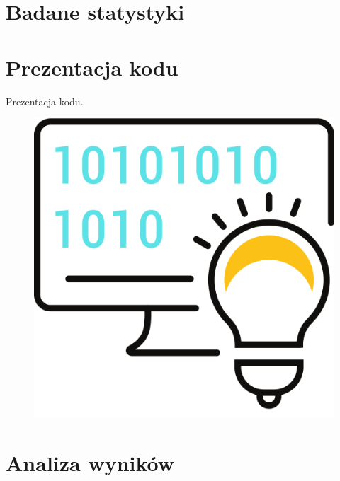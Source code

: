 \documentclass{beamer}
\begin{document}
\section{Badane statystyki}
\begin{frame}
		
\end{frame}
\begin{frame}
	
\end{frame}

\section{Prezentacja kodu}
\begin{frame}
	\begin{center}
		\huge{Prezentacja kodu.}
	\end{center}
	\begin{figure}
		\centering
		\includegraphics[width=0.5\linewidth]{../images/rys_6}
		\label{fig:rys6}
	\end{figure}
\end{frame}

\section{Analiza wyników}
\begin{frame}

\end{frame}
\begin{frame}

\end{frame}
\begin{frame}

\end{frame}
\begin{frame}

\end{frame}
\begin{frame}

\end{frame}
\begin{frame}

\end{frame}
\begin{frame}

\end{frame}
\begin{frame}

\end{frame}
\begin{frame}

\end{frame}
\end{document}
